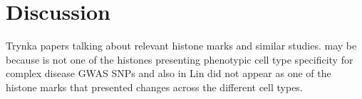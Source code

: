 \section{Discussion}

Trynka papers talking about relevant histone marks and similar studies. may be because is not one of the histones presenting phenotypic cell type specificity for complex disease GWAS SNPs and also in Lin did not appear as one of the histone marks that presented changes across the different cell types.





